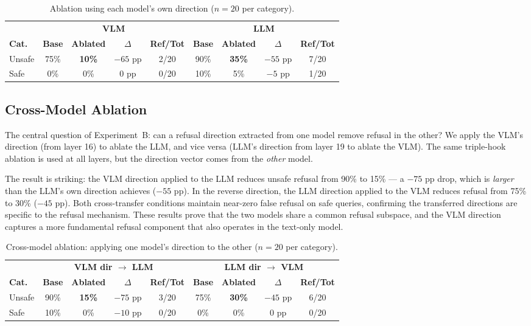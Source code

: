 \documentclass[11pt,a4paper]{article}
\begin{document}
\begin{table}[H]\centering
\caption{Ablation using each model's own direction ($n=20$ per category).}
\begin{tabular}{l|cccc|cccc}
\toprule
& \multicolumn{4}{c|}{\textbf{VLM}} & \multicolumn{4}{c}{\textbf{LLM}} \\
\textbf{Cat.} & \textbf{Base} & \textbf{Ablated} & \textbf{$\Delta$} & \textbf{Ref/Tot} & \textbf{Base} & \textbf{Ablated} & \textbf{$\Delta$} & \textbf{Ref/Tot} \\
\midrule
Unsafe & 75\% & \textbf{10\%} & $-65$ pp & 2/20 & 90\% & \textbf{35\%} & $-55$ pp & 7/20 \\
Safe   &  0\% & 0\%           & 0 pp     & 0/20 & 10\% & 5\%           & $-5$ pp  & 1/20 \\
\bottomrule
\end{tabular}
\end{table}

\subsection{Cross-Model Ablation}

The central question of Experiment~B: can a refusal direction extracted from one model remove refusal in the other? We apply the VLM's direction (from layer 16) to ablate the LLM, and vice versa (LLM's direction from layer 19 to ablate the VLM). The same triple-hook ablation is used at all layers, but the direction vector comes from the \emph{other} model.

The result is striking: the VLM direction applied to the LLM reduces unsafe refusal from 90\% to 15\% --- a $-75$ pp drop, which is \emph{larger} than the LLM's own direction achieves ($-55$ pp). In the reverse direction, the LLM direction applied to the VLM reduces refusal from 75\% to 30\% ($-45$ pp). Both cross-transfer conditions maintain near-zero false refusal on safe queries, confirming the transferred directions are specific to the refusal mechanism. These results prove that the two models share a common refusal subspace, and the VLM direction captures a more fundamental refusal component that also operates in the text-only model.

\begin{table}[H]\centering
\caption{Cross-model ablation: applying one model's direction to the other ($n=20$ per category).}
\begin{tabular}{l|cccc|cccc}
\toprule
& \multicolumn{4}{c|}{\textbf{VLM dir $\to$ LLM}} & \multicolumn{4}{c}{\textbf{LLM dir $\to$ VLM}} \\
\textbf{Cat.} & \textbf{Base} & \textbf{Ablated} & \textbf{$\Delta$} & \textbf{Ref/Tot} & \textbf{Base} & \textbf{Ablated} & \textbf{$\Delta$} & \textbf{Ref/Tot} \\
\midrule
Unsafe & 90\% & \textbf{15\%} & $-75$ pp & 3/20 & 75\% & \textbf{30\%} & $-45$ pp & 6/20 \\
Safe   & 10\% & 0\%           & $-10$ pp & 0/20 &  0\% & 0\%           & 0 pp     & 0/20 \\
\bottomrule
\end{tabular}
\end{table}
\end{document}
